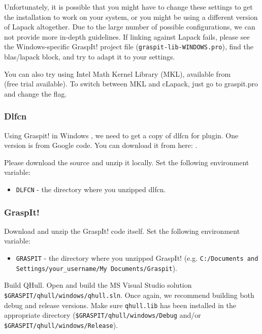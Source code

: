 Unfortunately, it is possible that you might have to change these
settings to get the installation to work on your system, or you might
be using a different version of Lapack altogether. Due to the large
number of possible configurations, we can not provide more in-depth
guidelines. If linking against Lapack fails, please see the
Windows-specific GraspIt! project file
(\texttt{graspit-lib-WINDOWS.pro}), find the blas/lapack block, and
try to adapt it to your settings.

You can also try using Intel Math Kernel Library (MKL), available from\\
  (free trial available).  To switch between MKL and cLapack, just go to graspit.pro and change the flag.


\subsubsection{Dlfcn}
Using Graspit! in Windows , we need to get a copy of dlfcn for plugin.  One version is from Google code.  You can download it from here: .

Please download the source and unzip it locally.  Set the following environment variable:
\begin{itemize}
\item \texttt{DLFCN} - the directory where you unzipped dlfcn.
\end{itemize}

\subsubsection{GraspIt!}

Download and unzip the GraspIt! code itself. Set the following
environment variable:

\begin{itemize}
\item \texttt{GRASPIT} - the directory where you unzipped GraspIt! (e.g. \texttt{C:/Documents and Settings/your\_username/My Documents/Graspit}).
\end{itemize}

Build QHull. Open and build the MS Visual Studio solution
\texttt{\$GRASPIT/qhull/windows/qhull.sln}. Once again, we recommend building
both debug and release versions. Make sure \texttt{qhull.lib} has been
installed in the appropriate directory
(\texttt{\$GRASPIT/qhull/windows/Debug}
and/or \texttt{\$GRASPIT/qhull/windows/Release}).

